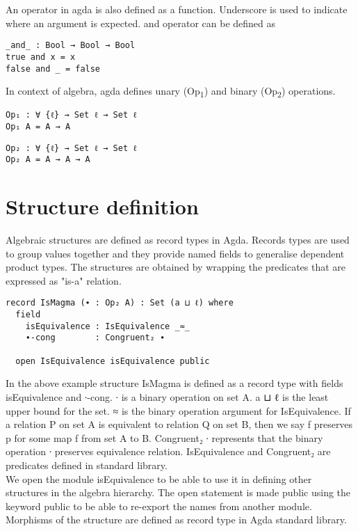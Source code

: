 An operator in agda is also defined as a function. Underscore is used to indicate where an argument is expected. and operator can be defined as 
\begin{Verbatim}
_and_ : Bool → Bool → Bool
true and x = x
false and _ = false
\end{Verbatim}

In context of algebra, agda defines unary (Op\textsubscript{1}) and binary (Op\textsubscript{2}) operations.
\begin{Verbatim}
Op₁ : ∀ {ℓ} → Set ℓ → Set ℓ
Op₁ A = A → A
\end{Verbatim}
\begin{Verbatim}
Op₂ : ∀ {ℓ} → Set ℓ → Set ℓ
Op₂ A = A → A → A
\end{Verbatim}

\section{Structure definition}
Algebraic structures are defined as record types in Agda. Records types are used to group values together and they provide named fields to generalise dependent product types. The structures are obtained by wrapping the predicates that are expressed as "is-a" relation. ~\citep{hu2021formalizing}
\begin{Verbatim}
record IsMagma (∙ : Op₂ A) : Set (a ⊔ ℓ) where
  field
    isEquivalence : IsEquivalence _≈_
    ∙-cong        : Congruent₂ ∙

  open IsEquivalence isEquivalence public
\end{Verbatim}
In the above example structure IsMagma is defined as a record type with fields isEquivalence and ∙-cong. ∙ is a binary operation on set A. a ⊔ ℓ is the least upper bound for the set. \textunderscore  ≈ \textunderscore is the binary operation argument for IsEquivalence. If a relation P on set A is equivalent to relation Q on set B, then we say f preserves p for some map f from set A to B. Congruent₂ ∙ represents that the binary operation ∙ preserves equivalence relation. IsEquivalence and Congruent₂ are predicates defined in standard library.\\
We open the module isEquivalence to be able to use it in defining other structures in the algebra hierarchy. The open statement is made public using the keyword public to be able to re-export the names from another module.\\
Morphisms of the structure are defined as record type in Agda standard library.\\
